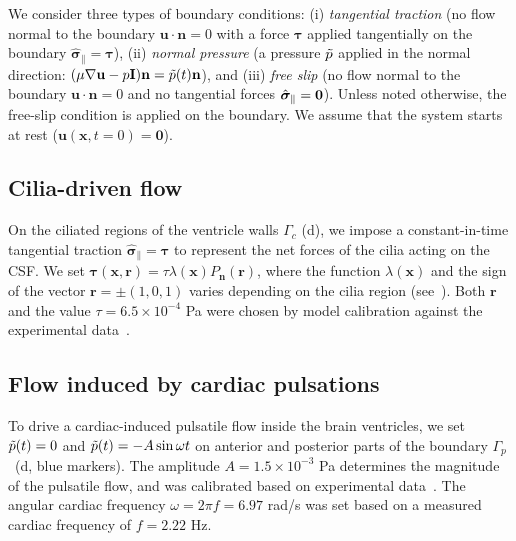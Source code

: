 \documentclass[fleqn]{wlscirep}
\newcommand{\Gc}{\Gamma_{c}}
\newcommand{\Gp}{\Gamma_{p}}
\newcommand{\nn}{\mathbf{n}}
\newcommand{\rr}{\mathbf{r}}
\newcommand{\uu}{\mathbf{u}}
\newcommand{\xx}{\bm{x}}
\newcommand{\bsig}{\bm{\sigma}}
\newcommand{\bsigpar}{\hat{\bsig}_{\parallel}}
\newcommand{\btau}{\bm{\tau}}
\begin{document}
We consider three types of boundary conditions:  (i) \emph{tangential traction} (no flow normal to the boundary $\uu \cdot \nn = 0$ with a force $\btau$ applied tangentially on the boundary $\bsigpar = \btau$),
(ii) \emph{normal pressure} (a pressure $\Tilde{p}$ applied in the normal direction: $(\mu\nabla\uu - p\mathbf{I})\nn = \Tilde{p}(t)\nn$),
and (iii) \emph{free slip} (no flow normal to the boundary $\uu \cdot \nn = 0$ and no tangential forces $\bsigpar = {\bf 0}$).
Unless noted otherwise, the free-slip condition is applied on the boundary. We assume that the system starts at rest ($\uu(\xx, t=0) = \mathbf{0}$).

\subsection*{Cilia-driven flow}
On the ciliated regions of the ventricle walls $\Gc$ (d), we impose a constant-in-time tangential traction $\bsigpar=\btau$ to represent the net forces of the cilia acting on the CSF.
We set $\btau(\xx, \rr) = \tau \lambda(\xx) P_{\nn}(\rr)$, where the function $\lambda(\xx)$ and the sign of the vector $\rr=\pm(1, 0, 1)$ varies depending on the cilia region (see~).
Both $\rr$ and the value $\tau=6.5\times 10^{-4}$ Pa were chosen by model calibration against the experimental data~\cite{Olstad2019CiliaryDevelopment}.

\subsection*{Flow induced by cardiac pulsations}\label{subsec:pressure_bcs}
To drive a cardiac-induced pulsatile flow inside the brain ventricles, we set $\Tilde{p}(t)=0$ and $\Tilde{p}(t)=-A\sin{\omega t}$ on anterior and posterior parts of the boundary $\Gp$~(d, blue markers).
The amplitude $A=1.5\times 10^{-3}$ Pa determines the magnitude of the pulsatile flow, and was calibrated based on experimental data~\cite{Olstad2019CiliaryDevelopment}.
The angular cardiac frequency $\omega=2\pi f=6.97$ rad/s was set based on a measured cardiac frequency of $f=2.22$ Hz.
\end{document}
